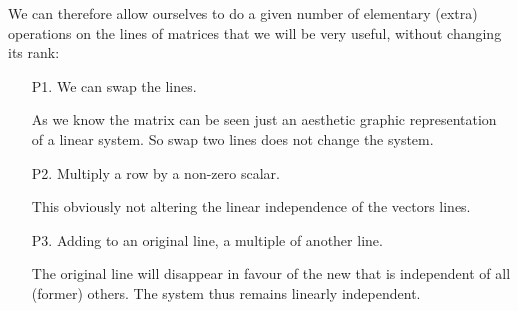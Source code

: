 	We can therefore allow ourselves to do a given number of elementary (extra) operations on the lines of matrices that we will be very useful, without changing its rank:
	\begin{enumerate}
		\item[P1.] We can swap the lines.
		\begin{tcolorbox}[title=Remark,colframe=black,arc=10pt]
		As we know the matrix can be seen just an aesthetic graphic representation of a linear system. So swap two lines does not change the system.
		\end{tcolorbox} 
		
		\item[P2.] Multiply a row by a non-zero scalar.
		\begin{tcolorbox}[title=Remark,colframe=black,arc=10pt]
		This obviously not altering the linear independence of the vectors lines.
		\end{tcolorbox} 
		
		\item[P3.] Adding to an original line, a multiple of another line.
		\begin{tcolorbox}[title=Remark,colframe=black,arc=10pt]
		The original line will disappear in favour of the new that is independent of all (former) others. The system thus remains linearly independent.
		\end{tcolorbox} 
	\end{enumerate}
	
